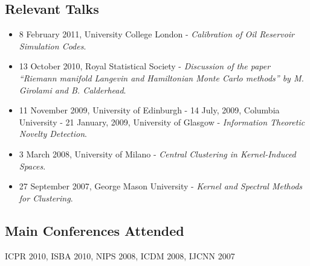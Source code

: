 \documentclass[a4paper,10pt]{article}
\begin{document}
\subsection*{Relevant Talks}
\begin{itemize}
\item 8 February 2011, University College London - \emph{Calibration of Oil Reservoir Simulation Codes}.
\item 13 October 2010, Royal Statistical Society - \emph{Discussion of the paper ``Riemann manifold Langevin and Hamiltonian Monte Carlo methods'' by M. Girolami and B. Calderhead}.
\item 11 November 2009, University of Edinburgh - 14 July, 2009, Columbia University - 21 January, 2009, University of Glasgow - \emph{Information Theoretic Novelty Detection}.
\item 3 March 2008, University of Milano - \emph{Central Clustering in Kernel-Induced Spaces}.
\item 27 September 2007, George Mason University - \emph{Kernel and Spectral Methods for Clustering}.
\end{itemize}

\subsection*{Main Conferences Attended}
 ICPR 2010, ISBA 2010, NIPS 2008, ICDM 2008, IJCNN 2007
\end{document}
